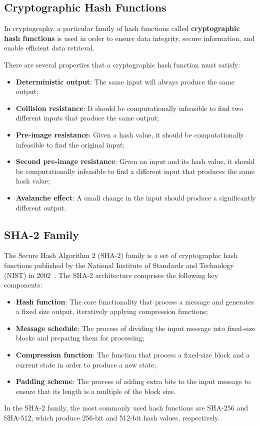 \documentclass[binding=0.6cm,oneside,noexaminfo]{sapthesis}
\begin{document}
\subsection{Cryptographic Hash Functions}
\label{cryptohashfunction}

In cryptography, a particular family of hash functions called 
\textbf{cryptographic hash functions} is used in order to ensure 
data  integrity,  secure  information,  and  enable 
efficient data retrieval.

There are several properties that a cryptographic hash function must satisfy:
\begin{itemize}
  \item \textbf{Deterministic output}: The same input will always produce the same output;
  \item \textbf{Collision resistance}: It should be computationally infeasible to find two 
  different inputs that produce the same output;
  \item \textbf{Pre-image resistance}: Given a hash value, it should be computationally infeasible 
  to find the original input;
  \item \textbf{Second pre-image resistance}: Given an input and its hash value, it should 
  be computationally infeasible to find a different input that produces the same hash value;
  \item \textbf{Avalanche effect}: A small change in the input should produce a significantly 
  different output.
\end{itemize}

\subsection{SHA-2 Family}
\label{sha2} 
The Secure Hash Algorithm 2 (SHA-2) family is a set of cryptographic hash functions
published by the National Institute of Standards 
and Technology (NIST) in 2002~\cite{NIST2002FIPS1802}.
The SHA-2 architecture comprises the following key components:
\begin{itemize}
  \item \textbf{Hash function}: The core functionality that process a message
  and generates a fixed size output, iteratively applying compression functions;
  \item \textbf{Message schedule}: The process of dividing the input message into 
  fixed-size blocks and preparing them for processing;
  \item \textbf{Compression function}: The function that process a fixed-size block
  and a current state in order to produce a new state;
  \item \textbf{Padding scheme}: The process of adding extra bits to the input message 
  to ensure that its length is a multiple of the block size.
\end{itemize}
In the SHA-2 family, the most commonly used hash functions are SHA-256 and SHA-512, 
which produce 256-bit and 512-bit hash values, respectively.
\end{document}
